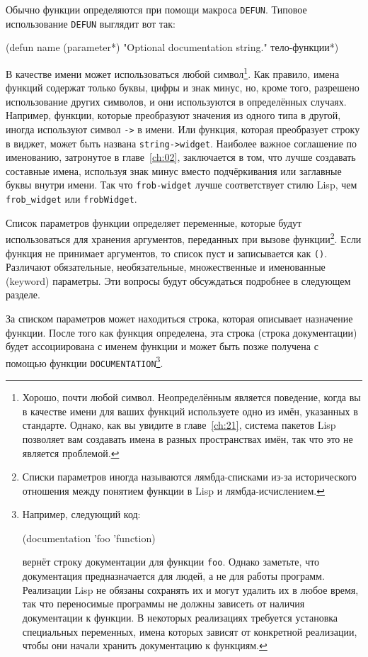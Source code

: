 Обычно функции определяются при помощи макроса \lstinline{DEFUN}.  Типовое использование
\lstinline{DEFUN} выглядит вот так:

\begin{myverb}
(defun name (parameter*)
  "Optional documentation string."
  тело-функции*)
\end{myverb}

В качестве имени может использоваться любой символ\footnote{Хорошо, почти любой символ.
  Неопределённым является поведение, когда вы в качестве имени для ваших функций
  используете одно из имён, указанных в стандарте.  Однако, как вы увидите в главе~\ref{ch:21},
  система пакетов Lisp позволяет вам создавать имена в разных пространствах имён, так что
  это не является проблемой.}.  Как правило, имена функций содержат только буквы, цифры и
знак минус, но, кроме того, разрешено использование других символов, и они используются в
определённых случаях.  Например, функции, которые преобразуют значения из одного типа в
другой, иногда используют символ \lstinline{->} в имени. Или функция, которая преобразует
строку в виджет, может быть названа \lstinline{string->widget}.  Наиболее важное соглашение по
именованию, затронутое в главе~\ref{ch:02}, заключается в том, что лучше создавать составные имена,
используя знак минус вместо подчёркивания или заглавные буквы внутри имени.
Так что \lstinline{frob-widget} лучше соответствует стилю Lisp, чем \lstinline!frob_widget! или
\lstinline{frobWidget}.

Список параметров функции определяет переменные, которые будут использоваться для хранения
аргументов, переданных при вызове функции\footnote{Списки параметров иногда называются
  лямбда-списками из-за исторического отношения между понятием функции в Lisp и
  лямбда-исчислением.}.  Если функция не принимает аргументов, то список пуст и
записывается как \lstinline{()}. Различают обязательные, необязательные, множественные и
именованные (keyword) параметры.  Эти вопросы будут обсуждаться подробнее в следующем
разделе.

За списком параметров может находиться строка, которая описывает назначение функции.
После того как функция определена, эта строка (строка документации) будет ассоциирована
с именем функции и может быть позже получена с помощью функции
\lstinline{DOCUMENTATION}\footnote{Например, следующий код:

\begin{myverb}
(documentation 'foo 'function)
\end{myverb}

\noindent{}вернёт строку документации для функции \lstinline{foo}.  Однако заметьте, что документация
предназначается для людей, а не для работы программ.  Реализации Lisp не обязаны сохранять
их и могут удалить их в любое время, так что переносимые программы не должны
зависеть от наличия документации к функции.  В некоторых реализациях требуется установка
специальных переменных, имена которых зависят от конкретной реализации, чтобы они начали
хранить документацию к функциям.}.

